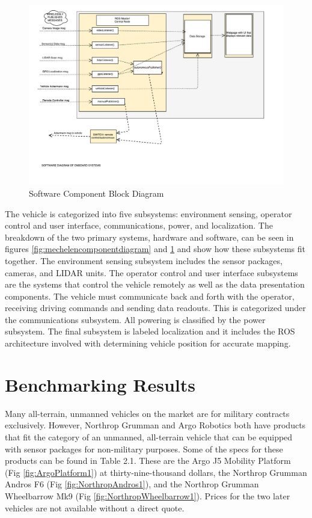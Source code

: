 \begin{figure}[H]
\centering
\includegraphics[scale=0.45]{Software_Component_Diagram}
\caption{Software Component Block Diagram}
\label{fig:softwarecomponentdiagram}
\end{figure}


The vehicle is categorized into five subsystems: environment sensing, operator control and user interface, communications, power, and localization. The breakdown of the two primary systems, hardware and software, can be seen in figures \ref{fig:mechelencomponentdiagram} and \ref{fig:softwarecomponentdiagram} and show how these subsystems fit together. The environment sensing subsystem includes the sensor packages, cameras, and LIDAR units. The operator control and user interface subsystems are the systems that control the vehicle remotely as well as the data presentation components. The vehicle must communicate back and forth with the operator, receiving driving commands and sending data readouts. This is categorized under the communications subsystem. All powering is classified by the power subsystem. The final subsystem is labeled localization and it includes the ROS architecture involved with determining vehicle position for accurate mapping. \\
%
\section{Benchmarking Results}
Many all-terrain, unmanned vehicles on the market are for military contracts exclusively. However, Northrop Grumman and Argo Robotics both have products that fit the category of an unmanned, all-terrain vehicle that can be equipped with sensor packages for non-military purposes. Some of the specs for these products can be found in Table 2.1. These are the Argo J5 Mobility Platform (Fig \ref{fig:ArgoPlatform1}) at thirty-nine-thousand dollars, the Northrop Grumman Andros F6 (Fig \ref{fig:NorthropAndros1}), and the Northrop Grumman Wheelbarrow Mk9 (Fig \ref{fig:NorthropWheelbarrow1}). Prices for the two later vehicles are not available without a direct quote. 

